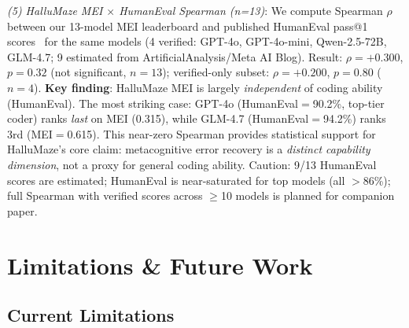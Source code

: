 \documentclass{article}
\begin{document}
\emph{(5) HalluMaze MEI $\times$ HumanEval Spearman (n=13)}: We compute Spearman $\rho$ between our 13-model MEI leaderboard and published HumanEval pass@1 scores~\citep{chen2021codex} for the same models (4 verified: GPT-4o, GPT-4o-mini, Qwen-2.5-72B, GLM-4.7; 9 estimated from ArtificialAnalysis/Meta AI Blog).
Result: $\rho{=}{+}0.300$, $p{=}0.32$ (not significant, $n{=}13$); verified-only subset: $\rho{=}{+}0.200$, $p{=}0.80$ ($n{=}4$).
\textbf{Key finding}: HalluMaze MEI is largely \emph{independent} of coding ability (HumanEval).
The most striking case: GPT-4o (HumanEval$=$90.2\%, top-tier coder) ranks \emph{last} on MEI (0.315), while GLM-4.7 (HumanEval$=$94.2\%) ranks 3rd (MEI$=$0.615).
This near-zero Spearman provides statistical support for HalluMaze's core claim: metacognitive error recovery is a \emph{distinct capability dimension}, not a proxy for general coding ability.
Caution: 9/13 HumanEval scores are estimated; HumanEval is near-saturated for top models (all $>$86\%); full Spearman with verified scores across $\geq$10 models is planned for companion paper.

\section{Limitations \& Future Work}

\subsection{Current Limitations}
\end{document}
